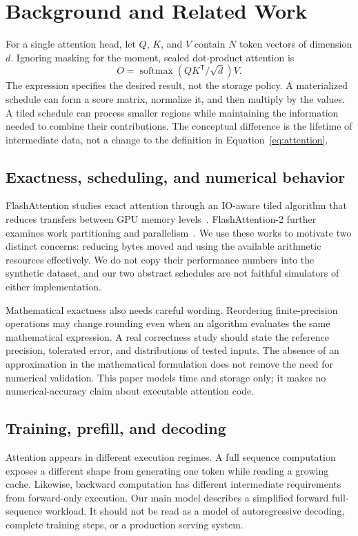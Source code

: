 \section{Background and Related Work}
\label{sec:background}
For a single attention head, let $Q$, $K$, and $V$ contain $N$ token vectors of dimension $d$. Ignoring masking for the moment, scaled dot-product attention is
\begin{equation}
 O=\operatorname{softmax}(QK^{\mathsf T}/\sqrt{d})V.
 \label{eq:attention}
\end{equation}
The expression specifies the desired result, not the storage policy. A materialized schedule can form a score matrix, normalize it, and then multiply by the values. A tiled schedule can process smaller regions while maintaining the information needed to combine their contributions. The conceptual difference is the lifetime of intermediate data, not a change to the definition in Equation~\ref{eq:attention}.

\subsection{Exactness, scheduling, and numerical behavior}
FlashAttention studies exact attention through an IO-aware tiled algorithm that reduces transfers between GPU memory levels~\cite{dao2022flashattention}. FlashAttention-2 further examines work partitioning and parallelism~\cite{dao2023flashattention2}. We use these works to motivate two distinct concerns: reducing bytes moved and using the available arithmetic resources effectively. We do not copy their performance numbers into the synthetic dataset, and our two abstract schedules are not faithful simulators of either implementation.

Mathematical exactness also needs careful wording. Reordering finite-precision operations may change rounding even when an algorithm evaluates the same mathematical expression. A real correctness study should state the reference precision, tolerated error, and distributions of tested inputs. The absence of an approximation in the mathematical formulation does not remove the need for numerical validation. This paper models time and storage only; it makes no numerical-accuracy claim about executable attention code.

\subsection{Training, prefill, and decoding}
Attention appears in different execution regimes. A full sequence computation exposes a different shape from generating one token while reading a growing cache. Likewise, backward computation has different intermediate requirements from forward-only execution. Our main model describes a simplified forward full-sequence workload. It should not be read as a model of autoregressive decoding, complete training steps, or a production serving system.

